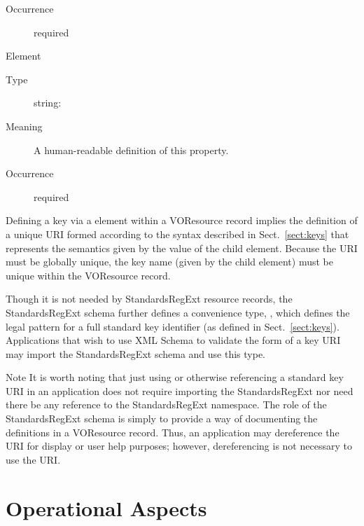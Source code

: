 \documentclass[11pt,a4paper]{ivoa}
\begin{document}
\begin{generated}
\begin{bigdescription}
\begin{description}
\item[Occurrence] required


\end{description}
\item[Element \xmlel{description}]
\begin{description}
\item[Type] string: 
\item[Meaning] 
                  A human-readable definition of this property.  
               
\item[Occurrence] required

\end{description}


\end{bigdescription}\endgroup

\endgroup
\end{generated}



Defining a key via a  element within a
VOResource record implies the definition of a unique URI formed
according to the syntax described in Sect.~\ref{sect:keys}
that represents the semantics given by the value of the 
 child element.  Because the URI must
be globally unique, the key name (given by the
 child element) must be unique within the
VOResource record.

Though it is not needed by StandardsRegExt resource records, the StandardsRegExt
schema further defines a convenience type,
, which defines the legal pattern for
a full standard key identifier (as defined in
Sect.~\ref{sect:keys}).  Applications that wish to use
XML Schema to validate the form of a key URI may import the StandardsRegExt
schema and use this type.  


\begin{admonition}{Note}
It is worth noting that just using or otherwise referencing a
standard key URI in an application does not require importing
the StandardsRegExt nor need there be any reference to the
StandardsRegExt namespace.  The role of the StandardsRegExt schema is
simply to provide a way of documenting the definitions in a
VOResource record.  Thus, an application may dereference the
URI for display or user help purposes; however, dereferencing
is not necessary to use the URI. 
\end{admonition}

\section{Operational Aspects}
\end{document}
